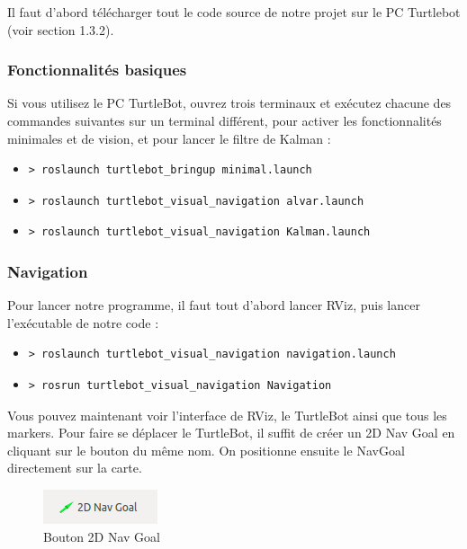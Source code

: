 \documentclass[10pt,a4paper]{article}
\begin{document}
Il faut d'abord télécharger tout le code source de notre projet sur le PC Turtlebot (voir section 1.3.2).

\subsubsection{Fonctionnalités basiques}
\label{sec:navigation2}

Si vous utilisez le PC TurtleBot, ouvrez trois terminaux et exécutez chacune des commandes suivantes sur un terminal différent, pour activer les fonctionnalités minimales et de vision, et pour lancer le filtre de Kalman :

\begin{itemize}
\item[]  \begin{verbatim}> roslaunch turtlebot_bringup minimal.launch \end{verbatim}
\item[]  \begin{verbatim}> roslaunch turtlebot_visual_navigation alvar.launch \end{verbatim}
\item[]  \begin{verbatim}> roslaunch turtlebot_visual_navigation Kalman.launch \end{verbatim}
\end{itemize}

\subsubsection{Navigation}
\label{sec:navigation}

Pour lancer notre programme, il faut tout d'abord lancer RViz, puis lancer l'exécutable de notre code :

\begin{itemize}
\item[] \begin{verbatim}> roslaunch turtlebot_visual_navigation navigation.launch \end{verbatim}
\item[]  \begin{verbatim}> rosrun turtlebot_visual_navigation Navigation \end{verbatim}
\end{itemize}

Vous pouvez maintenant voir l'interface de RViz, le TurtleBot ainsi que tous les markers.
Pour faire se déplacer le TurtleBot, il suffit de créer un 2D Nav Goal en cliquant sur le bouton du même nom. On positionne ensuite le NavGoal directement sur la carte.\\
\begin{figure}[!h]
  \centering
  \noindent\includegraphics[scale=0.5]{2DNavGoal.png} 
  \caption{Bouton 2D Nav Goal}
\end{figure}
\end{document}
